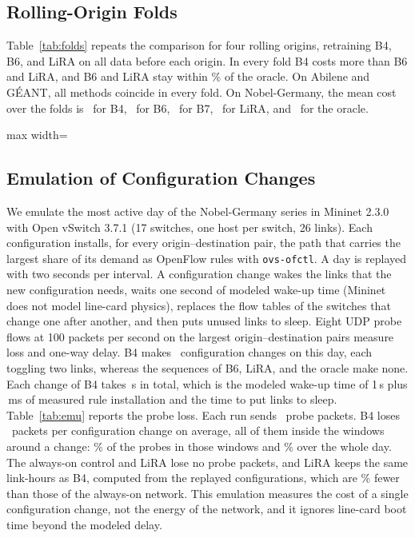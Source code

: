 \documentclass[preprint,12pt]{elsarticle}
\begin{document}
\subsection{Rolling-Origin Folds}

Table~\ref{tab:folds} repeats the comparison for four rolling origins, retraining B4, B6, and LiRA on all data before each origin. In every fold B4 costs more than B6 and LiRA, and B6 and LiRA stay within \foldMaxGap\% of the oracle. On Abilene and G\'{E}ANT, all methods coincide in every fold. On Nobel-Germany, the mean cost over the folds is \foldNobBFour\ for B4, \foldNobBSix\ for B6, \foldNobBSeven\ for B7, \foldNobLiRA\ for LiRA, and \foldNobO\ for the oracle.

\begin{table}[t]
\centering
\caption{Rolling-Origin Folds (Mean over Four Folds, Default Price)}
\label{tab:folds}
\footnotesize
\setlength{\tabcolsep}{3pt}
\begin{adjustbox}{max width=\textwidth}\end{adjustbox}
\end{table}

\subsection{Emulation of Configuration Changes}\label{sec:res-emu}

We emulate the most active day of the Nobel-Germany series in Mininet 2.3.0 with Open vSwitch 3.7.1 (17 switches, one host per switch, 26 links). Each configuration installs, for every origin--destination pair, the path that carries the largest share of its demand as OpenFlow rules with \texttt{ovs-ofctl}. A day is replayed with two seconds per interval. A configuration change wakes the links that the new configuration needs, waits one second of modeled wake-up time (Mininet does not model line-card physics), replaces the flow tables of the switches that change one after another, and then puts unused links to sleep. Eight UDP probe flows at 100 packets per second on the largest origin--destination pairs measure loss and one-way delay. B4 makes \emuTrans\ configuration changes on this day, each toggling two links, whereas the sequences of B6, LiRA, and the oracle make none. Each change of B4 takes \emuTransS\,s in total, which is the modeled wake-up time of 1\,s plus \emuRuleMs\,ms of measured rule installation and the time to put links to sleep. Table~\ref{tab:emu} reports the probe loss. Each run sends \emuProbePkts\ probe packets. B4 loses \emuLostPerTrans\ packets per configuration change on average, all of them inside the windows around a change: \emuLossWin\% of the probes in those windows and \emuLossAll\% over the whole day. The always-on control and LiRA lose no probe packets, and LiRA keeps the same link-hours as B4, computed from the replayed configurations, which are \emuLinkSave\% fewer than those of the always-on network. This emulation measures the cost of a single configuration change, not the energy of the network, and it ignores line-card boot time beyond the modeled delay.
\end{document}
